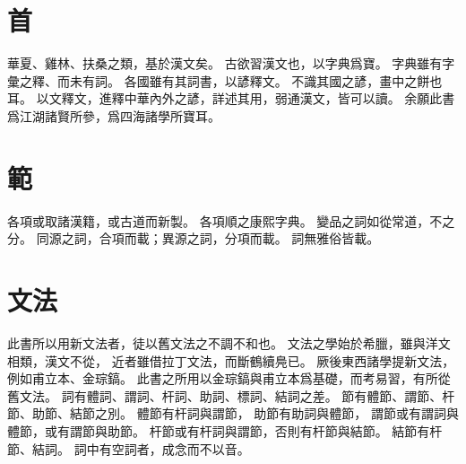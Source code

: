 \section{首}
華夏、雞林、扶桑之類，基於漢文矣。
古欲習漢文也，以字典爲寶。
字典雖有字彙之釋、而未有詞。
各國雖有其詞書，以諺釋文。
不識其國之諺，畫中之餅也耳。
以文釋文，進釋中華內外之諺，詳述其用，弱通漢文，皆可以讀。
余願此書爲江湖諸賢所參，爲四海諸學所寶耳。
\section{範}
各項或取諸漢籍，或古道而新製。
各項順之康熙字典。
變品之詞如從常道，不之分。
同源之詞，合項而載；異源之詞，分項而載。
詞無雅俗皆載。
\section{文法}
此書所以用新文法者，徒以舊文法之不調不和也。
文法之學始於希臘，雖與洋文相類，漢文不從，
近者雖借拉丁文法，而斷鶴續鳧已。
厥後東西諸學提新文法，例如甫立本、金琮鎬。
此書之所用以金琮鎬與甫立本爲基礎，而考易習，有所從舊文法。
詞有體詞、謂詞、杆詞、助詞、標詞、結詞之差。
節有體節、謂節、杆節、助節、結節之別。
體節有杆詞與謂節，
助節有助詞與體節，
謂節或有謂詞與體節，或有謂節與助節。
杆節或有杆詞與謂節，否則有杆節與結節。
結節有杆節、結詞。
詞中有空詞者，成念而不以音。
